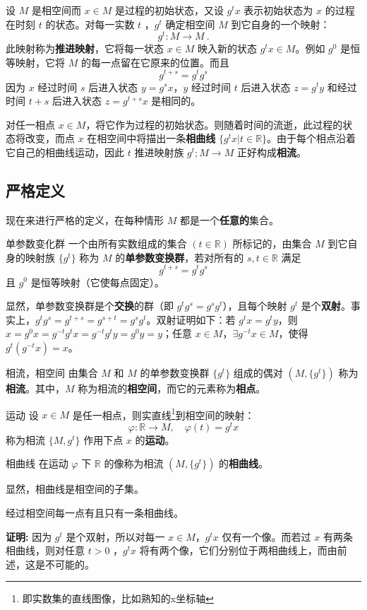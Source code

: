 设 $M$ 是相空间而 $x\in M$ 是过程的初始状态，又设 $g^t x$ 表示初始状态为 $x$ 的过程在时刻 $t$ 的状态。对每一实数 $t$ ，$g^t$ 确定相空间 $M$ 到它自身的一个映射：
\begin{equation}
g^t:M\rightarrow M~.
\end{equation}
此映射称为\textbf{推进映射}，它将每一状态 $x\in M$ 映入新的状态 $g^t x\in M$。例如 $g^0$ 是恒等映射，它将 $M$ 的每一点留在它原来的位置。而且
\begin{equation}
g^{t+s}=g^tg^s
\end{equation}
因为 $x$ 经过时间 $s$ 后进入状态 $y=g^s x$，$y$ 经过时间 $t$ 后进入状态 $z=g^t y$ 和经过时间 $t+s$ 后进入状态 $z=g^{t+s} x$ 是相同的。

对任一相点 $x\in M$，将它作为过程的初始状态。则随着时间的流逝，此过程的状态将改变，而点 $x$ 在相空间中将描出一条\textbf{相曲线} $\{g^tx|t\in \mathbb R\}$。由于每个相点沿着它自己的相曲线运动，因此 $t$ 推进映射族 $g^t;M\rightarrow M$ 正好构成\textbf{相流}。 
\subsection{严格定义}
现在来进行严格的定义，在每种情形 $M$ 都是一个\textbf{任意的}集合。
\begin{definition}{单参数变化群}\label{def_PSaPF_1}
一个由所有实数组成的集合 $(t\in \mathbb R)$ 所标记的，由集合 $M$ 到它自身的映射族 $\{g^t\}$ 称为 $M$ 的\textbf{单参数变换群}，若对所有的 $s,t\in\mathbb R$ 满足
\begin{equation}
g^{t+s}=g^tg^s
\end{equation}
 且 $g^0$ 是恒等映射（它使每点固定）。
\end{definition}
显然，单参数变换群是个\textbf{交换}的群（即 $g^tg^s=g^sg^t$），且每个映射 $g^t$ 是个\textbf{双射}。事实上，$g^tg^s=g^{t+s}=g^{s+t}=g^sg^t$。双射证明如下：若 $g^t x=g^t y$，则 $x=g^0x=g^{-t}g^tx=g^{-t}g^ty=g^0y=y$；任意 $x\in M$，$\exists g^{-t}x\in M$，使得 $g^t(g^{-t}x)=x$。
\begin{definition}{相流，相空间}
由集合 $M$ 和 $M$ 的单参数变换群 $\{g^t\}$ 组成的偶对 $(M,\{g^t\})$ 称为\textbf{相流}。其中，$M$ 称为相流的\textbf{相空间}，而它的元素称为\textbf{相点}。
\end{definition}
\begin{definition}{运动}
设 $x\in M$ 是任一相点，则实直线\footnote{即实数集的直线图像，比如熟知的x坐标轴}到相空间的映射：
\begin{equation}\label{eq_PSaPF_1}
\varphi:\mathbb R\rightarrow M,\quad \varphi(t)=g^tx
\end{equation}
称为相流 $\{M,{g^t}\}$ 作用下点 $x$ 的\textbf{运动}。
\end{definition}
\begin{definition}{相曲线}
在运动 $\varphi$ 下 $\mathbb R$ 的像称为相流 $(M,\{g^t\})$ 的\textbf{相曲线}。
\end{definition}
显然，相曲线是相空间的子集。
\begin{theorem}{}\label{the_PSaPF_1}
经过相空间每一点有且只有一条相曲线。
\end{theorem}
\textbf{证明:}
因为 $g^t$ 是个双射，所以对每一 $x\in M$，$g^t x$ 仅有一个像。而若过 $x$ 有两条相曲线，则对任意 $t>0$ ，$g^tx$ 将有两个像，它们分别位于两相曲线上，而由前述，这是不可能的。

